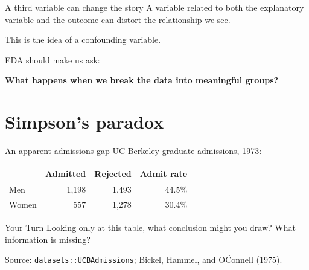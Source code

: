\documentclass[11pt,aspectratio=169]{beamer}
\newcommand{\yourturn}[1]{%
\begin{center}
\begin{minipage}{0.88\textwidth}
\begin{alertblock}{Your Turn}
#1
\end{alertblock}
\end{minipage}
\end{center}}
\begin{document}
\begin{frame}{A third variable can change the story}
A variable related to both the explanatory variable and the outcome can distort the relationship we see.

\vspace{0.8em}
\begin{center}
\Large This is the idea of a \alert{confounding variable}.
\end{center}

\vspace{0.7em}
EDA should make us ask:

\begin{center}
\textbf{What happens when we break the data into meaningful groups?}
\end{center}
\end{frame}

\section{Simpson's paradox}

\begin{frame}{An apparent admissions gap}
UC Berkeley graduate admissions, 1973:

\begin{center}
\renewcommand{\arraystretch}{1.2}
\begin{tabular}{lrrr}
\toprule
 & Admitted & Rejected & Admit rate \\
\midrule
Men & 1,198 & 1,493 & 44.5\% \\
Women & 557 & 1,278 & 30.4\% \\
\bottomrule
\end{tabular}
\end{center}

\vspace{0.6em}
\yourturn{Looking only at this table, what conclusion might you draw? What information is missing?}
\vspace{-0.2em}
{\tiny Source: \texttt{datasets::UCBAdmissions}; Bickel, Hammel, and O\'Connell (1975).}
\end{frame}
\end{document}
